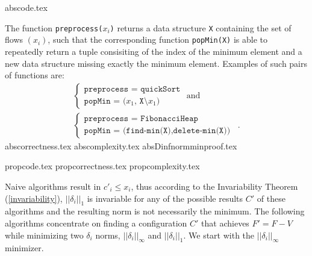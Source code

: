 \documentclass[11pt]{llncs}
\begin{document}
  {abscode.tex}

  The function \texttt{preprocess(}$x_i$\texttt{)} returns a data structure \texttt{X} containing the set of flows
  $\left(x_i\right)$, such that the corresponding function \texttt{popMin(X)} is able to repeatedly return a tuple
  consisiting of the index of the minimum element and a new data structure missing exactly the minimum element.
  Examples of such pairs of functions are:
  \begin{equation*}
  \begin{gathered}
    \begin{cases}
      \texttt{preprocess = quickSort} \\
      \texttt{popMin = (}x_1\texttt{, X}\setminus x_1\texttt{)}
    \end{cases}
    \mbox{ and} \\
    \begin{cases}
      \texttt{preprocess = FibonacciHeap} \\
      \texttt{popMin = (find-min(X),delete-min(X))}
    \end{cases} \enspace.
  \end{gathered}
  \end{equation*}
  {abscorrectness.tex}
  {abscomplexity.tex}
  {absDinfnormminproof.tex}

  {propcode.tex}
  {propcorrectness.tex}
  {propcomplexity.tex}

  Naive algorithms result in $c'_i \leq x_i$, thus according to the Invariability Theorem (\ref{invariability}),
  $||\delta_i||_1$ is invariable for any of the possible results $C'$ of these algorithms and the resulting norm is not
  necessarily the minimum. The following algorithms concentrate on finding a configuration $C'$ that achieves $F' = F - V$
  while minimizing two $\delta_i$ norms, $||\delta_i||_\infty$ and $||\delta_i||_1$. We start with the
  $||\delta_i||_\infty$ minimizer.
\end{document}
